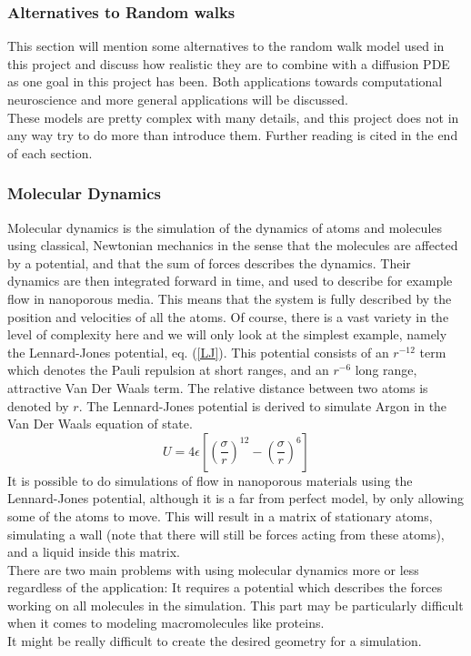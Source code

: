 \subsubsection{Alternatives to Random walks}
This section will mention some alternatives to the random walk model used in this project and discuss how realistic they are to combine with a diffusion PDE as one goal in this project has been. 
Both applications towards computational neuroscience and more general applications will be discussed. \\
These models are pretty complex with many details, and this project does not in any way try to do more than introduce them. 
Further reading is cited in the end of each section.

\subsubsection{Molecular Dynamics}
Molecular dynamics is the simulation of the dynamics of atoms and molecules using classical, Newtonian mechanics in the sense that the molecules are affected by a potential, and that the sum of forces describes the dynamics. 
Their dynamics are then integrated forward in time, and used to describe for example flow in nanoporous media. 
This means that the system is fully described by the position and velocities of all the atoms. 
Of course, there is a vast variety in the level of complexity here and we will only look at the simplest example, namely the Lennard-Jones potential, eq. (\ref{LJ}). 
This potential consists of an $r^{-12}$ term which denotes the Pauli repulsion at short ranges, and an $r^{-6}$ long range, attractive Van Der Waals term. 
The relative distance between two atoms is denoted by $r$. 
The Lennard-Jones potential is derived to simulate Argon in the Van Der Waals equation of state.
\begin{equation}\label{LJ}
 U = 4\epsilon\left[\left(\frac{\sigma}{r}\right)^{12}-\left(\frac{\sigma}{r}\right)^{6}\right]
\end{equation}
It is possible to do simulations of flow in nanoporous materials using the Lennard-Jones potential, although it is a far from perfect model, by only allowing some of the atoms to move. 
This will result in a matrix of stationary atoms, simulating a wall (note that there will still be forces acting from these atoms), and a liquid inside this matrix. \\

There are two main problems with using molecular dynamics more or less regardless of the application: 
It requires a potential which describes the forces working on all molecules in the simulation. 
This part may be particularly difficult when it comes to modeling macromolecules like proteins.\\
It might be really difficult to create the desired geometry for a simulation. 

